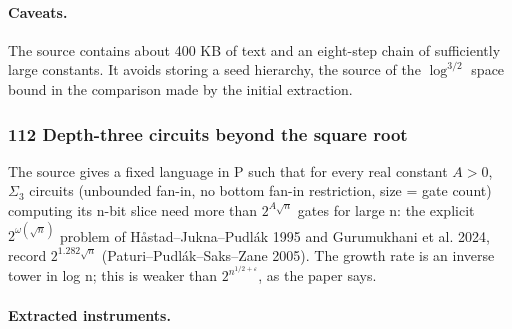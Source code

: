 \documentclass[11pt]{article}
\newcommand{\badges}[1]{\par\noindent{\small\sffamily\color{black!70}#1}\par\smallskip}
\newcommand{\badgesep}{\textbar}
\begin{document}
\paragraph{Caveats.}

The source contains about 400 KB of text and an eight-step chain of sufficiently large constants. It avoids storing a seed hierarchy, the source of the $\log^{3/2}$ space bound in the comparison made by the initial extraction.

\subsubsection{\texorpdfstring{112 \textperiodcentered{} Depth-three circuits beyond the square root}{112 · Depth-three circuits beyond the square root}}\label{fam:112}
\badges{Lean, 179 files \badgesep{} new}

The source gives a fixed language in P such that for every real constant $A>0$, $\Sigma_{3}$ circuits (unbounded fan-in, no bottom fan-in restriction, size = gate count) computing its n-bit slice need more than $2^{A\sqrt n}$ gates for large n: the explicit $2^{\omega(\sqrt n)}$ problem of Håstad--Jukna--Pudlák 1995 and Gurumukhani et al. 2024, record $2^{1.282\sqrt n}$ (Paturi--Pudlák--Saks--Zane 2005). The growth rate is an inverse tower in log n; this is weaker than $2^{n^{1/2+\varepsilon}}$, as the paper says.

\paragraph{Extracted instruments.}
\end{document}

